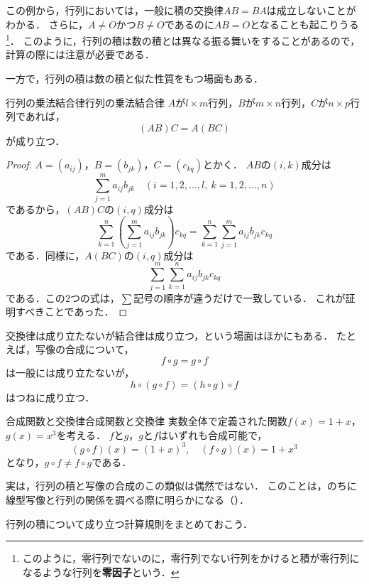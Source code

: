 この例から，行列においては，一般に積の交換律$AB = BA$は成立しないことがわかる．
さらに，$A \ne O$かつ$B \ne O$であるのに$AB = O$となることも起こりうる\footnote{このように，零行列でないのに，零行列でない行列をかけると積が零行列になるような行列を\textbf{零因子}という．}．
このように，行列の積は数の積とは異なる振る舞いをすることがあるので，計算の際には注意が必要である．

一方で，行列の積は数の積と似た性質をもつ場面もある．

\begin{prop}{行列の乗法結合律}{行列の乗法結合律}
  $A$が$l \times m$行列，$B$が$m \times n$行列，$C$が$n \times p$行列であれば，
  \[
    (AB)C = A(BC)
  \]
  が成り立つ．
\end{prop}

\begin{leftbar}
\begin{proof}
  $A = (a_{ij})$，$B = (b_{jk})$，$C = (c_{kq})$とかく．
  $AB$の$(i, k)$成分は
  \[
    \sum_{j=1}^{m} a_{ij} b_{jk}
    \quad (i = 1, 2, \dots, l,~ k = 1, 2, \dots, n)
  \]
  であるから，$(AB)C$の$(i, q)$成分は
  \[
    \sum_{k=1}^{n} \left( \sum_{j=1}^{m} a_{ij} b_{jk} \right) c_{kq}
    = \sum_{k=1}^{n} \sum_{j=1}^{m} a_{ij} b_{jk} c_{kq}
  \]
  である．同様に，$A(BC)$の$(i, q)$成分は
  \[
    \sum_{j=1}^{m} \sum_{k=1}^{n} a_{ij} b_{jk} c_{kq}
  \]
  である．この$2$つの式は，$\sum$記号の順序が違うだけで一致している．
  これが証明すべきことであった．
\end{proof}
\end{leftbar}

交換律は成り立たないが結合律は成り立つ，という場面はほかにもある．
たとえば，写像の合成について，
\[
  f \circ g = g \circ f
\]
は一般には成り立たないが，
\[
  h \circ (g \circ f) = (h \circ g) \circ f
\]
はつねに成り立つ．

\begin{example}{合成関数と交換律}{合成関数と交換律}
  実数全体で定義された関数$f(x) = 1 + x$，$g(x) = x^3$を考える．
  $f$と$g$，$g$と$f$はいずれも合成可能で，
  \[
    (g \circ f)(x) = (1 + x)^3, \quad (f \circ g)(x) = 1 + x^3
  \]
  となり，$g \circ f \ne f \circ g$である．
\end{example}

実は，行列の積と写像の合成のこの類似は偶然ではない．
このことは，のちに線型写像と行列の関係を調べる際に明らかになる（）．

行列の積について成り立つ計算規則をまとめておこう．

